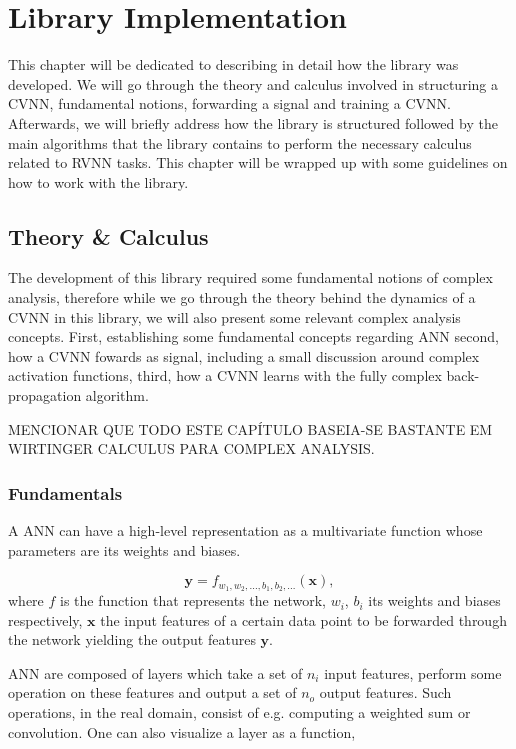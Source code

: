 \chapter{Library Implementation}
This chapter will be dedicated to describing in detail how the library was developed. We will go through the theory and calculus involved in structuring a \gls{CVNN}, fundamental notions, forwarding a signal and training a \gls{CVNN}. Afterwards, we will briefly address how the library is structured followed by the main algorithms that the library contains to perform the necessary calculus related to \gls{RVNN} tasks. This chapter will be wrapped up with some guidelines on how to work with the library.

\section{Theory \& Calculus}
The development of this library required some fundamental notions of complex analysis, therefore while we go through the theory behind the dynamics of a \gls{CVNN}  in this library, we will also present some relevant complex analysis concepts. First, establishing some fundamental concepts regarding \gls{ANN} second, how a \gls{CVNN} fowards as signal, including a small discussion around complex activation functions, third, how a \gls{CVNN} learns with the fully complex back-propagation algorithm.

MENCIONAR QUE TODO ESTE CAPÍTULO BASEIA-SE BASTANTE EM WIRTINGER CALCULUS PARA COMPLEX ANALYSIS.

\subsection{Fundamentals}
\label{subsec:fundamentals}
A \gls{ANN} can have a high-level representation  as a multivariate function whose parameters are its weights and biases.

\begin{equation}
	\mathbf{y} = f_{w_{1}, w_{2}, ..., b_{1}, b_{2}, ...}(\mathbf{x}),
	\label{eq:network}
\end{equation}
where $ f $ is the function that represents the network, $ w_{i} $, $ b_{i} $ its weights and biases respectively, $ \mathbf{x} $ the input features of a certain data point to be forwarded through the network yielding the output features $ \mathbf{y} $. 

\gls{ANN} are composed of layers which take a set of $ n_i $ input features, perform some operation on these features and output a set of $ n_o $ output features. Such operations, in the real domain, consist of e.g. computing a weighted sum or convolution. One can also visualize a layer as a function,

